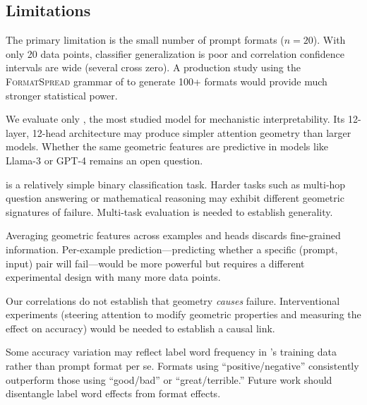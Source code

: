 \subsection{Limitations}
\label{sec:limitations}

The primary limitation is the small number of prompt formats ($n = 20$).
With only 20 data points, classifier generalization is poor and correlation confidence intervals are wide (several cross zero).
A production study using the \textsc{FormatSpread} grammar of \citet{sclar2023quantifying} to generate 100+ formats would provide much stronger statistical power.

We evaluate only \gptsmall, the most studied model for mechanistic interpretability.
Its 12-layer, 12-head architecture may produce simpler attention geometry than larger models.
Whether the same geometric features are predictive in models like Llama-3 or GPT-4 remains an open question.

\ssttwo is a relatively simple binary classification task.
Harder tasks such as multi-hop question answering or mathematical reasoning may exhibit different geometric signatures of failure.
Multi-task evaluation is needed to establish generality.

Averaging geometric features across examples and heads discards fine-grained information.
Per-example prediction---predicting whether a specific (prompt, input) pair will fail---would be more powerful but requires a different experimental design with many more data points.

Our correlations do not establish that geometry \emph{causes} failure.
Interventional experiments (\eg steering attention to modify geometric properties and measuring the effect on accuracy) would be needed to establish a causal link.

Some accuracy variation may reflect label word frequency in \gptsmall's training data rather than prompt format per se.
Formats using ``positive/negative'' consistently outperform those using ``good/bad'' or ``great/terrible.''
Future work should disentangle label word effects from format effects.
